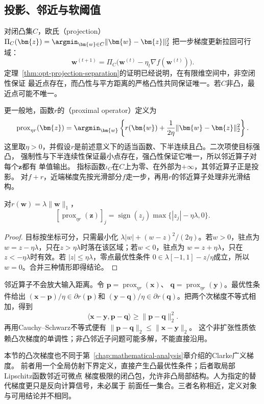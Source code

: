\subsection{投影、邻近与软阈值}

对闭凸集$C$，欧氏（projection）
$\Pi_C(\bm{z})=\argmin_{\bm{w}\in C}\lVert\bm{w}-\bm{z}\rVert_2^2$
把一步梯度更新拉回可行域：
\[
  \bm{w}^{(t+1)}
  =\Pi_C\bigl(\bm{w}^{(t)}-\eta_t\nabla f(\bm{w}^{(t)})\bigr).
\]
定理~\ref{thm:opt-projection-separation}的证明已经说明，在有限维空间中，非空闭性保证
最近点存在，而凸性与平方距离的严格凸性共同保证唯一。若$C$非凸，最近点可能不唯一。

更一般地，函数$r$的（proximal operator）定义为
\[
  \operatorname{prox}_{\eta r}(\bm{z})
  =\argmin_{\bm{w}}
  \left\{r(\bm{w})+\frac{1}{2\eta}
  \lVert\bm{w}-\bm{z}\rVert_2^2\right\}.
\]
这里取$\eta>0$，并假设$r$是前述意义下的适当函数、下半连续且凸。二次项使目标强凸，
强制性与下半连续性保证最小点存在，强凸性保证它唯一，所以邻近算子对每个$\bm{z}$都有
单值输出。
指标函数$\iota_C$在$C$上为零、在外部为$+\infty$，其邻近算子正是投影。
对$f+r$，近端梯度先按光滑部分$f$走一步，再用$r$的邻近算子处理非光滑结构。

\begin{theorem}
\label{thm:opt-soft-threshold}
对$r(\bm{w})=\lambda\lVert\bm{w}\rVert_1$，
\[
  [\operatorname{prox}_{\eta r}(\bm{z})]_j
  =\operatorname{sign}(z_j)\max\{|z_j|-\eta\lambda,0\}.
\]
\end{theorem}

\begin{proof}
目标按坐标可分，只需最小化
$\lambda|w|+(w-z)^2/(2\eta)$。若$w>0$，驻点为
$w=z-\eta\lambda$，只在$z>\eta\lambda$时落在该区域；若$w<0$，驻点为
$w=z+\eta\lambda$，只在$z<-\eta\lambda$时有效。若
$|z|\leq\eta\lambda$，零点最优性条件
$0\in\lambda[-1,1]-z/\eta$成立，所以$w=0$。合并三种情形即得结论。
\end{proof}

邻近算子不会放大输入距离。令
$\bm{p}=\operatorname{prox}_{\eta r}(\bm{x})$、
$\bm{q}=\operatorname{prox}_{\eta r}(\bm{y})$。最优性条件给出
$(\bm{x}-\bm{p})/\eta\in\partial r(\bm{p})$和
$(\bm{y}-\bm{q})/\eta\in\partial r(\bm{q})$。把两个次梯度不等式相加，得到
\[
  \langle\bm{x}-\bm{y},\bm{p}-\bm{q}\rangle
  \geq\lVert\bm{p}-\bm{q}\rVert_2^2.
\]
再用Cauchy--Schwarz不等式便有
$\lVert\bm{p}-\bm{q}\rVert_2\leq\lVert\bm{x}-\bm{y}\rVert_2$。
这个非扩张性质依赖凸次梯度的单调性；非凸邻近子问题可能多解，不能直接沿用。

本节的凸次梯度也不同于第~\ref{chap:mathematical-analysis}章介绍的Clarke广义梯度。
前者用一个全局仿射下界定义，直接产生凸最优性条件；后者取局部Lipschitz函数邻近可微点
梯度极限的闭凸包，允许非凸局部结构。人为指定的替代梯度更只是反向计算信号，未必属于
前面任一集合。三者名称相近，定义对象与可用结论并不相同。

